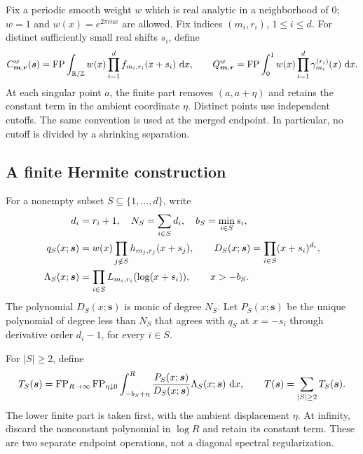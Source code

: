 Fix a periodic smooth weight $w$ which is real analytic in a neighborhood
of $0$; $w=1$ and $w(x)=e^{2\pi i n x}$ are allowed.  Fix indices
$(m_i,r_i)$, $1\le i\le d$.  For distinct sufficiently small real shifts
$s_i$, define
\begin{equation}\label{gcx:CQ}
 C_{\boldsymbol m,\boldsymbol r}^{w}(\boldsymbol s)
 =\operatorname{FP}\int_{\mathbb R/\mathbb Z} w(x)\prod_{i=1}^d f_{m_i,r_i}(x+s_i)\,\,\mathrm d x,
 \qquad
 Q_{\boldsymbol m,\boldsymbol r}^{w}
 =\operatorname{FP}\int_0^1w(x)\prod_{i=1}^d\gamma_{m_i}^{(r_i)}(x)\,\,\mathrm d x.
\end{equation}
At each singular point $a$, the finite part removes $(a,a+\eta)$ and
retains the constant term in the ambient coordinate $\eta$.  Distinct
points use independent cutoffs.  The same convention is used at the
merged endpoint.  In particular, no cutoff is divided by a shrinking
separation.

\subsection{A finite Hermite construction}

For a nonempty subset $S\subseteq\{1,\ldots,d\}$, write
\begin{align}
 d_i&=r_i+1,\quad N_S=\sum_{i\in S}d_i,\quad
 b_S=\min_{i\in S}s_i,\notag\\
 q_S(x;\boldsymbol s)&=w(x)\prod_{j\notin S}h_{m_j,r_j}(x+s_j),
 \qquad
 D_S(x;\boldsymbol s)=\prod_{i\in S}(x+s_i)^{d_i},
 \label{gcx:qD}\\
 \Lambda_S(x;\boldsymbol s)&=
              \prod_{i\in S}L_{m_i,r_i}(\log(x+s_i)),
 \qquad x>-b_S.
 \label{gcx:Lambda}
\end{align}
The polynomial $D_S(x;\boldsymbol s)$ is monic of degree $N_S$.  Let $P_S(x;\boldsymbol s)$ be the unique polynomial of degree
less than $N_S$ that agrees with $q_S$ at $x=-s_i$ through derivative
order $d_i-1$, for every $i\in S$.

\begin{definition}
\label{gcx:counterterm-definition}
For $|S|\ge2$, define
\begin{equation}\label{gcx:T}
 T_S(\boldsymbol s)=\operatorname{FP}_{R\to\infty}\operatorname{FP}_{\eta\downarrow0}
 \int_{-b_S+\eta}^{R}
       \frac{P_S(x;\boldsymbol s)}{D_S(x;\boldsymbol s)}
                  \Lambda_S(x;\boldsymbol s)\,\,\mathrm d x,
 \qquad
 T(\boldsymbol s)=\sum_{|S|\ge2}T_S(\boldsymbol s).
\end{equation}
The lower finite part is taken first, with the ambient displacement
$\eta$.  At infinity, discard the nonconstant polynomial in $\log R$
and retain its constant term.  These are two separate endpoint
operations, not a diagonal spectral regularization.
\end{definition}

